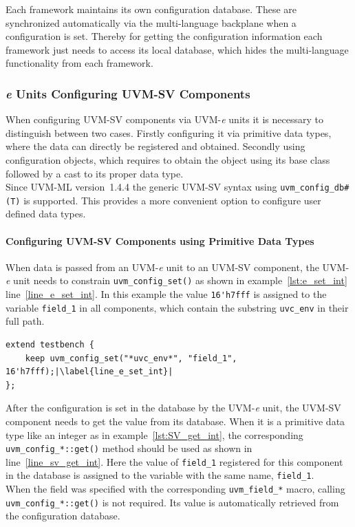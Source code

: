 Each framework maintains its own configuration database. These are synchronized automatically via the multi-language
backplane when a configuration is set. Thereby for getting the configuration information each framework just needs to
access its local database, which hides the multi-language functionality from each framework.

\subsubsection{\textit{e} Units Configuring UVM-SV Components}\label{e_config_sv}

When configuring UVM-SV components via UVM-\textit{e} units it is necessary to distinguish between two cases. Firstly
configuring it via primitive data types, where the data can directly be registered and obtained. Secondly using
configuration objects, which requires to obtain the object using its base class followed by a cast to its proper data
type.\\
Since UVM-ML version~1.4.4 the generic UVM-SV syntax using \lstinline$uvm_config_db#(T)$ is supported. This
provides a more convenient option to configure user defined data types. 

\paragraph{Configuring UVM-SV Components using Primitive Data Types}\label{config_sv_primitive}

When data is passed from an UVM-\textit{e} unit to an UVM-SV component,
the UVM-\textit{e} unit needs to constrain \lstinline$uvm_config_set()$ as shown in example~\ref{lst:e_set_int}
line~\ref{line_e_set_int}. In this example the value \lstinline$16'h7fff$ is assigned to the variable
\lstinline$field_1$ in all components, which contain the substring \lstinline$uvc_env$ in their full path.

\lstset{language=e, numbers = left, escapechar=|, breaklines=true}
\begin{lstlisting}[frame=htrbl, caption={\textit{e}: register an integer in configuration database},
label={lst:e_set_int}]
extend testbench {
    keep uvm_config_set("*uvc_env*", "field_1", 16'h7fff);|\label{line_e_set_int}|
};
\end{lstlisting}

After the configuration is set in the database by the UVM-\textit{e} unit, the UVM-SV component needs to get
the value from its database. When it is a primitive data type like an integer as in example~\ref{lst:SV_get_int},
the corresponding \lstinline$uvm_config_*::get()$ method should be used as shown in line~\ref{line_sv_get_int}. Here the
value of \lstinline$field_1$ registered for this component in the database is assigned to the variable with the same
name, \lstinline$field_1$.\\
When the field was specified with the corresponding \lstinline$uvm_field_*$ macro, calling
\lstinline$uvm_config_*::get()$ is not required. Its value is automatically retrieved from the configuration database.

